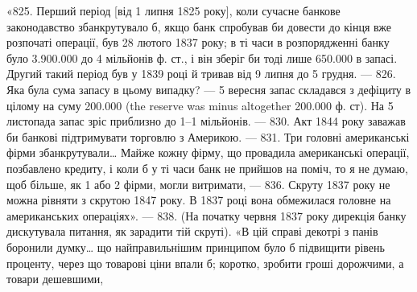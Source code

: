 «825. Перший період [від 1 липня 1825 року], коли сучасне банкове
законодавство збанкрутувало б, якщо банк спробував би довести до кінця вже
розпочаті операції, був 28 лютого 1837 року; в ті часи в розпорядженні банку
було \num{3.900.000} до 4 мільйонів ф. ст., і він зберіг би тоді лише \num{650.000}
в запасі. Другий такий період був у 1839 році й тривав від 9 липня до 5 грудня.
— 826. Яка була сума запасу в цьому випадку? — 5 вересня запас
складався з дефіциту в цілому на суму \num{200.000} (the reserve was minus
altogether \num{200.000} ф. ст). На 5 листопада запас зріс приблизно до 1--1
мільйонів. — 830. Акт 1844 року заважав би банкові підтримувати торговлю
з Америкою. — 831. Три головні американські фірми збанкрутували\dots{} Майже
кожну фірму, що провадила американські операції, позбавлено кредиту, і
коли б у ті часи банк не прийшов на поміч, то я не думаю, щоб більше, як
1 або 2 фірми, могли витримати, — 836. Скруту 1837 року не можна рівняти
з скрутою 1847 року. В 1837 році вона обмежилася головне на американських
операціях». — 838. (На початку червня 1837 року дирекція банку дискутувала
питання, як зарадити тій скруті). «В цій справі декотрі з панів боронили думку\dots{}
що найправильнішим принципом було б підвищити рівень проценту, через що
товарові ціни впали б; коротко, зробити гроші дорожчими, а товари дешевшими,
\parbreak{}  %
